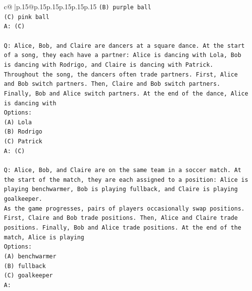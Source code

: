 \documentclass{article}
\begin{document}
{\begin{supertabular}{c@{$\;$}|p{.15\linewidth}@{}p{.15\linewidth}p{.15\linewidth}p{.15\linewidth}p{.15\linewidth}p{.15\linewidth}}
{{{\texttt{(B) purple ball} \\
\texttt{(C) pink ball} \\
\texttt{A: (C)} \\
\\ 
\texttt{Q: Alice, Bob, and Claire are dancers at a square dance. At the start of a song, they each have a partner: Alice is dancing with Lola, Bob is dancing with Rodrigo, and Claire is dancing with Patrick.} \\
\texttt{Throughout the song, the dancers often trade partners. First, Alice and Bob switch partners. Then, Claire and Bob switch partners. Finally, Bob and Alice switch partners. At the end of the dance, Alice is dancing with} \\
\texttt{Options:} \\
\texttt{(A) Lola} \\
\texttt{(B) Rodrigo} \\
\texttt{(C) Patrick} \\
\texttt{A: (C)} \\
\\ 
\texttt{Q: Alice, Bob, and Claire are on the same team in a soccer match. At the start of the match, they are each assigned to a position: Alice is playing benchwarmer, Bob is playing fullback, and Claire is playing goalkeeper.} \\
\texttt{As the game progresses, pairs of players occasionally swap positions. First, Claire and Bob trade positions. Then, Alice and Claire trade positions. Finally, Bob and Alice trade positions. At the end of the match, Alice is playing} \\
\texttt{Options:} \\
\texttt{(A) benchwarmer} \\
\texttt{(B) fullback} \\
\texttt{(C) goalkeeper} \\
\texttt{A:} \\
            }
        }
    }
     \\ \\


\end{supertabular}}
\end{document}
